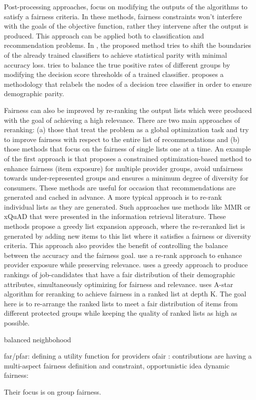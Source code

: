 Post-processing approaches, focus on modifying the outputs of the algorithms to satisfy a fairness criteria. In these methods, fairness constraints won't interfere with the goals of the objective function, rather they intervene after the output is produced. This approach can be applied both to classification and recommendation problems.
In \cite{fish2016confidence}, the proposed method tries to shift the boundaries of the already trained classifiers to achieve statistical parity with minimal accuracy loss. \cite{hardt2016equality} tries to balance the true positive rates of different groups by modifying the decision score thresholds of a trained classifier. \cite{kamiran2010discrimination} proposes a methodology that relabels the nodes of a decision tree classifier in order to ensure demographic parity.

Fairness can also be improved by re-ranking the output lists which were produced with the goal of achieving a high relevance. There are two main approaches of reranking: (a) those that treat the problem as a global optimization task and try to improve fairness with respect to the entire list of recommendations and (b) those methods that focus on the fairness of single lists one at a time.
An example of the first approach is \cite{surer2018multistakeholder} that proposes a constrained optimization-based method to enhance fairness (item exposure) for multiple provider groups, avoid unfairness towards under-represented groups and ensures a minimum degree of diversity for consumers. These methods are useful for occasion that recommendations are generated and cached in advance.
A more typical approach is to re-rank individual lists as they are generated. Such approaches use methods like MMR \cite{carbonell1998use} or xQuAD \cite{santos2010explicit} that were presented in the information retrieval literature. These methods propose a greedy list expansion approach, where the re-reranked list is generated by adding new items to this list where it satisfies a fairness or diversity criteria. This approach also provides the benefit of controlling the balance between the accuracy and the fairness goal. 
\cite{modani2017fairness} use a re-rank approach to enhance provider exposure while preserving relevance. \cite{Geyik2019} uses a greedy approach to produce rankings of job-candidates that have a fair distribution of their demographic attributes, simultaneously optimizing for fairness and relevance. \cite{zehlike2017fa} uses A-star algorithm for reranking to achieve fairness in a ranked list at depth K. The goal here is to re-arrange the ranked lists to meet a fair distribution of items from different protected groups while keeping the quality of ranked lists as high as possible. 




balanced neighbohood

far/pfar: defining a utility function for providers
ofair : contributions are having a multi-aspect fairness definition and constraint, opportunistic idea
dynamic fairness:

Their focus is on group fairness.